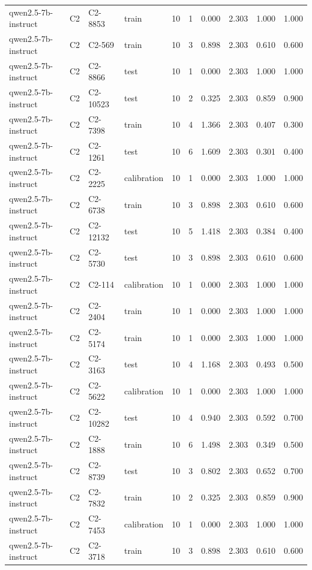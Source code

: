 \begin{table}
\begin{tabular}{llllrrrrrr}
qwen2.5-7b-instruct & C2 & C2-8853 & train & 10 & 1 & 0.000 & 2.303 & 1.000 & 1.000 \\
qwen2.5-7b-instruct & C2 & C2-569 & train & 10 & 3 & 0.898 & 2.303 & 0.610 & 0.600 \\
qwen2.5-7b-instruct & C2 & C2-8866 & test & 10 & 1 & 0.000 & 2.303 & 1.000 & 1.000 \\
qwen2.5-7b-instruct & C2 & C2-10523 & test & 10 & 2 & 0.325 & 2.303 & 0.859 & 0.900 \\
qwen2.5-7b-instruct & C2 & C2-7398 & train & 10 & 4 & 1.366 & 2.303 & 0.407 & 0.300 \\
qwen2.5-7b-instruct & C2 & C2-1261 & test & 10 & 6 & 1.609 & 2.303 & 0.301 & 0.400 \\
qwen2.5-7b-instruct & C2 & C2-2225 & calibration & 10 & 1 & 0.000 & 2.303 & 1.000 & 1.000 \\
qwen2.5-7b-instruct & C2 & C2-6738 & train & 10 & 3 & 0.898 & 2.303 & 0.610 & 0.600 \\
qwen2.5-7b-instruct & C2 & C2-12132 & test & 10 & 5 & 1.418 & 2.303 & 0.384 & 0.400 \\
qwen2.5-7b-instruct & C2 & C2-5730 & test & 10 & 3 & 0.898 & 2.303 & 0.610 & 0.600 \\
qwen2.5-7b-instruct & C2 & C2-114 & calibration & 10 & 1 & 0.000 & 2.303 & 1.000 & 1.000 \\
qwen2.5-7b-instruct & C2 & C2-2404 & train & 10 & 1 & 0.000 & 2.303 & 1.000 & 1.000 \\
qwen2.5-7b-instruct & C2 & C2-5174 & train & 10 & 1 & 0.000 & 2.303 & 1.000 & 1.000 \\
qwen2.5-7b-instruct & C2 & C2-3163 & test & 10 & 4 & 1.168 & 2.303 & 0.493 & 0.500 \\
qwen2.5-7b-instruct & C2 & C2-5622 & calibration & 10 & 1 & 0.000 & 2.303 & 1.000 & 1.000 \\
qwen2.5-7b-instruct & C2 & C2-10282 & test & 10 & 4 & 0.940 & 2.303 & 0.592 & 0.700 \\
qwen2.5-7b-instruct & C2 & C2-1888 & train & 10 & 6 & 1.498 & 2.303 & 0.349 & 0.500 \\
qwen2.5-7b-instruct & C2 & C2-8739 & test & 10 & 3 & 0.802 & 2.303 & 0.652 & 0.700 \\
qwen2.5-7b-instruct & C2 & C2-7832 & train & 10 & 2 & 0.325 & 2.303 & 0.859 & 0.900 \\
qwen2.5-7b-instruct & C2 & C2-7453 & calibration & 10 & 1 & 0.000 & 2.303 & 1.000 & 1.000 \\
qwen2.5-7b-instruct & C2 & C2-3718 & train & 10 & 3 & 0.898 & 2.303 & 0.610 & 0.600 \\

\end{tabular}
\end{table}
